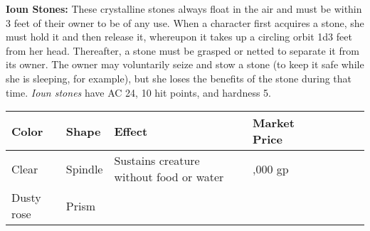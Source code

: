 \textbf{Ioun Stones:} These crystalline stones always float in the air and must 
be within 3 feet of their owner to be of any use. When a character first acquires 
a stone, she must hold it and then release it, whereupon it takes up a circling 
orbit 1d3 feet from her head. Thereafter, a stone must be grasped or netted to 
separate it from its owner. The owner may voluntarily seize and stow a stone (to 
keep it safe while she is sleeping, for example), but she loses the benefits of 
the stone during that time. \textit{Ioun stones }have AC 24, 10 hit points, and 
hardness 5.

\begin{longtable}{llllllll}
\hline
\multicolumn{1}{|p{0.931in}|}{\begin{minipage}[t]{0.931in}\raggedright
\textbf{Color}\end{minipage}} & \multicolumn{1}{p{0.566in}|}{\begin{minipage}[t]{0.566in}\raggedright
\textbf{Shape}\end{minipage}} & \multicolumn{1}{p{2.187in}|}{\begin{minipage}[t]{2.187in}\raggedright
\textbf{Effect}\end{minipage}} & \multicolumn{1}{p{0.620in}|}{\begin{minipage}[t]{0.620in}\raggedleft
\textbf{Market Price}\end{minipage}}\\
\hline
\multicolumn{1}{p{0.049in}|}{\begin{minipage}[t]{0.049in}\raggedleft
Clear\end{minipage}} & \multicolumn{1}{p{0.049in}|}{\begin{minipage}[t]{0.049in}\raggedleft
Spindle\end{minipage}} & \multicolumn{1}{p{0.049in}|}{\begin{minipage}[t]{0.049in}\raggedleft
Sustains creature without food or water\end{minipage}} & \multicolumn{1}{p{0.049in}|}{\begin{minipage}[t]{0.049in}\raggedleft
4,000 gp\end{minipage}}\\
\hline
\multicolumn{1}{|p{0.931in}|}{\begin{minipage}[t]{0.931in}\raggedleft
Dusty rose\end{minipage}} & \multicolumn{1}{p{0.566in}|}{\begin{minipage}[t]{0.566in}\raggedleft
Prism\end{minipage}} & \multicolumn{1}{p{2.187in}|}{\begin{minipage}[t]{2.187in}\raggedleft

\end{minipage}}
\end{longtable}
